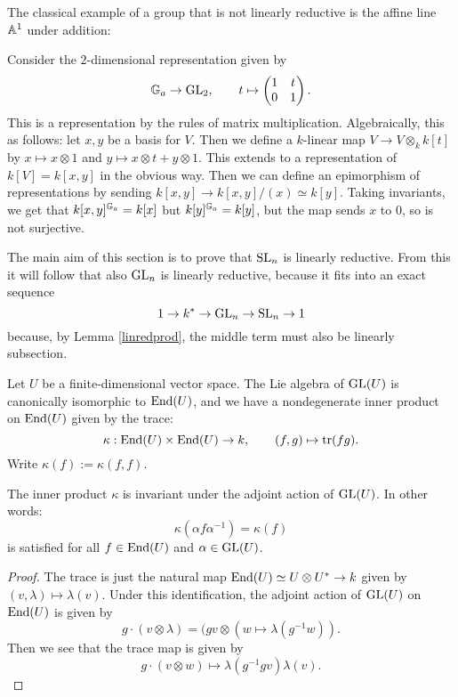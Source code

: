 \documentclass[11pt, english]{article}
\begin{document}
The classical example of a group that is not linearly reductive is the affine line $\mathbb{A}^1$ under addition:
\begin{example}
 Consider the $2$-dimensional representation given by
\[
\mathbb{G}_a \to \operatorname{GL}_2, \qquad t \mapsto \begin{pmatrix} 1 & t \\ 0 & 1 \end{pmatrix}.
\]
This is a representation by the rules of matrix multiplication. Algebraically, this as follows: let $x,y$ be a basis for $V$. Then we define a $k$-linear map $V \to V \otimes_k k[t]$ by $x \mapsto x \otimes 1$ and $y \mapsto x \otimes t + y \otimes 1$. This extends to a representation of $k[V]=k[x,y]$ in the obvious way. Then we can define an epimorphism of representations by sending $k[x,y] \to k[x,y]/(x) \simeq k[y]$. Taking invariants, we get that $k[x,y]^{\mathbb{G}_a} = k[x]$ but $k[y]^{\mathbb{G}_a}=k[y]$, but the map sends $x$ to $0$, so is not surjective.
\end{example}

The main aim of this section is to prove that $\operatorname{SL}_n$ is linearly reductive. From this it will follow that also $\operatorname{GL}_n$ is linearly reductive, because it fits into an exact sequence 
$$
1 \to k^\ast \to \operatorname{GL}_n \to \operatorname{SL}_n \to 1
$$
because, by Lemma \ref{linredprod}, the middle term must also be linearly subsection.

Let $U$ be a finite-dimensional vector space. The Lie algebra of $\operatorname{GL}(U)$ is canonically isomorphic to $\operatorname{End}(U)$, and we have a nondegenerate inner product on $\operatorname{End}(U)$ given by the trace:
$$
\kappa:\operatorname{End}(U) \times \operatorname{End}(U) \to k, \qquad (f,g) \mapsto \operatorname{tr}(fg).
$$
Write $\kappa(f) := \kappa(f,f)$. 

\begin{lemma}
The inner product $\kappa$ is invariant under the adjoint action of $\operatorname{GL}(U)$. In other words:
\[
\kappa(\alpha f \alpha^{-1}) =  \kappa(f)
\]
is satisfied for all $f \in \operatorname{End}(U)$ and $\alpha \in \operatorname{GL}(U)$.
\end{lemma}
\begin{proof}
The trace is just the natural map $\operatorname{End}(U) \simeq U \otimes U^\ast \to k$ given by $(v,\lambda) \mapsto \lambda(v)$. Under this identification, the adjoint action of $\operatorname{GL}(U)$ on $\operatorname{End}(U)$ is given by $$g \cdot (v \otimes \lambda) = (gv \otimes (w \mapsto \lambda(g^{-1}w)).$$
Then we see that the trace map is given by
$$
g \cdot (v \otimes w) \mapsto \lambda(g^{-1}gv)\lambda(v).
$$
\end{proof}
\end{document}

